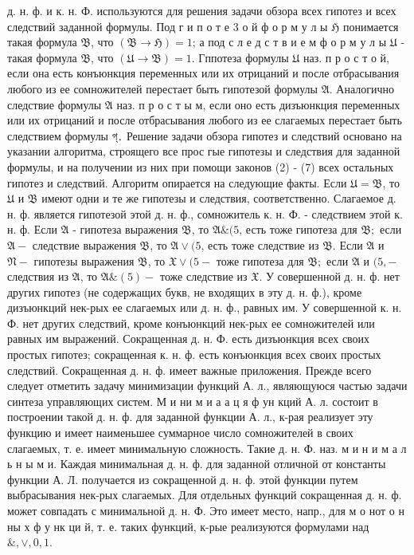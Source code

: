 \documentclass[10pt]{article}
\begin{document}
д. н. ф. и к. н. Ф. используются для решения задачи обзора всех гипотез и всех следствий заданной формулы. Под г и п о т е 3 о й ф о р м у л ы $\mathfrak{H}$ понимается такая формула $\mathfrak{B}$, что $(\mathfrak{B} \rightarrow \mathfrak{H})=1$; а под с л е д с т в и е м ф о р м у л ы $\mathfrak{U}$ - такая формула $\mathfrak{B}$, что $(\mathfrak{U} \rightarrow \mathfrak{B})=1$. Гппотеза формулы $\mathfrak{U}$ наз. п р о с т о й, если она есть конъюнкция переменных или их отрицаний и после отбрасывания любого из ее сомножителей перестает быть гипотезой формулы $\mathfrak{A}$. Аналогично следствие формулы $\mathfrak{A}$ наз. п р о с т ы м, если оно есть дизъюнкция переменных или их отрицаний и после отбрасывания любого из ее слагаемых перестает быть следствием формулы গ্․ Решение задачи обзора гипотез и следствий основано на указании алгоритма, строящего все прос гые гипотезы и следствия для заданной формулы, и на получении из них при помощи законов (2) - (7) всех остальных гипотез и следствий. Алгоритм опирается на следующие факты. Если $\mathfrak{U}=\mathfrak{B}$, то $\mathfrak{U}$ и $\mathfrak{B}$ имеют одни и те же гипотезы и следствия, соответственно. Слагаемое д. н. ф. является гипотезой этой д. н. ф., сомножитель к. н. Ф. - следствием этой к. н. ф. Если $\mathfrak{A}$ - гипотеза выражения $\mathfrak{B}$, то $\mathfrak{A} \&(5$, есть тоже гипотеза для $\mathfrak{B} ;$ если $\mathfrak{A}-$ следствие выражения $\mathfrak{B}$, то $\mathfrak{A} \vee(5$, есть тоже следствие из $\mathfrak{B}$. Если $\mathfrak{A}$ и $\mathfrak{N}-$ гипотезы выражения $\mathfrak{B}$, то $\mathfrak{X} \vee(5-$ тоже гипотеза для $\mathfrak{B} ;$ если $\mathfrak{A}$ и $(5,-$ следствия из $\mathfrak{A}$, то $\mathfrak{A} \&(5)-$ тоже следствие из $\mathfrak{X}$. У совершенной д. н. ф. нет других гипотез (не содержащих букв, не входящих в эту д. н. ф.), кроме дизъюнкций нек-рых ее слагаемых или д. н. ф., равных им. У совершенной к. н. Ф. нет других следствий, кроме конъюнкций нек-рых ее сомножителей или равных им выражений. Сокращенная д. н. Ф. есть дизъюнкция всех своих простых гипотез; сокращенная к. н. ф. есть конъюнкция всех своих простых следствий. Сокращенная д. н. ф. имеет важные приложения. Прежде всего следует отметить задачу минимизации функций А. л., являющуюся частью задачи синтеза управляющих систем. М и ни м и $\mathbf{а}$ а ц я ф ун кций А. л. состоит в построении такой д. н. ф. для заданной функции А. л., к-рая реализует эту функцию и имеет наименьшее суммарное число сомножителей в своих слагаемых, т. е. имеет минимальную сложность. Такие д. н. Ф. наз. м и н и м а л ь н ы м и. Каждая минимальная д. н. ф. для заданной отличной от константы функции А. Л. получается из сокращенной д. н. ф. этой функции путем выбрасывания нек-рых слагаемых. Для отдельных функций сокращенная д. н. ф. может совпадать с минимальной д. н. Ф. Это имеет место, напр., для м о нот о н ны х ф у нк ци й, т. е. таких функций, к-рые реализуются формулами над $\&, \vee, 0,1$.
\end{document}
